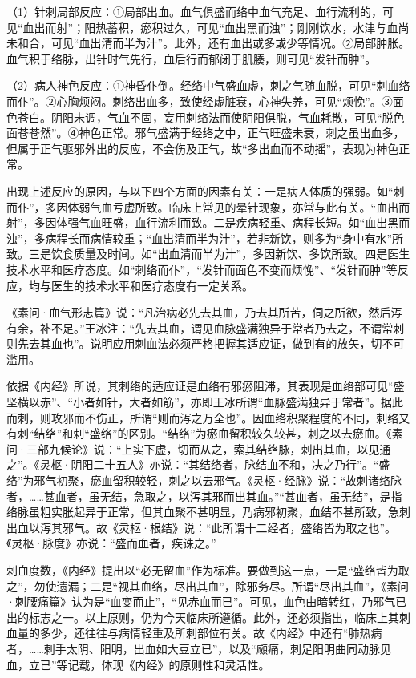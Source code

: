 \documentclass[12pt]{ctexbook}%
\begin{document}
（1）针刺局部反应：①局部出血。血气俱盛而络中血气充足、血行流利的，可见“血出而射”；阳热蓄积，瘀积过久，可见“血出黑而浊”；刚刚饮水，水津与血尚未和合，可见“血出清而半为汁”。此外，还有血出或多或少等情况。②局部肿胀。血气积于络脉，出针时气先行，血后行而郁闭于肌腠，则可见“发针而肿”。

（2）病人神色反应：①神昏仆倒。经络中气盛血虚，刺之气随血脱，可见“刺血络而仆”。②心胸烦闷。刺络出血多，致使经虚脏衰，心神失养，可见“烦悗”。③面色苍白。阴阳未调，气血不固，妄用刺络法而使阴阳俱脱，气血耗散，可见“脱色面苍苍然”。④神色正常。邪气盛满于经络之中，正气旺盛未衰，刺之虽出血多，但属于正气驱邪外出的反应，不会伤及正气，故“多出血而不动摇”，表现为神色正常。

出现上述反应的原因，与以下四个方面的因素有关：一是病人体质的强弱。如“刺而仆”，多因体弱气血亏虚所致。临床上常见的晕针现象，亦常与此有关。“血出而射”，多因体强气血旺盛，血行流利而致。二是疾病轻重、病程长短。如“血出黑而浊”，多病程长而病情较重；“血出清而半为汁”，若非新饮，则多为“身中有水”所致。三是饮食质量及时间。如“出血清而半为汁”，多因新饮、多饮所致。四是医生技术水平和医疗态度。如“刺络而仆”，“发针而面色不变而烦悗”、“发针而肿”等反应，均与医生的技术水平和医疗态度有一定关系。



《素问·血气形志篇》说：“凡治病必先去其血，乃去其所苦，伺之所欲，然后泻有余，补不足。”王冰注：“先去其血，谓见血脉盛满独异于常者乃去之，不谓常刺则先去其血也”。说明应用刺血法必须严格把握其适应证，做到有的放矢，切不可滥用。

依据《内经》所说，其刺络的适应证是血络有邪瘀阻滞，其表现是血络部可见“盛坚横以赤”、“小者如针，大者如筋”，亦即王冰所谓“血脉盛满独异于常者”。据此而刺，则攻邪而不伤正，所谓“则而泻之万全也”。因血络积聚程度的不同，刺络又有刺“结络”和刺“盛络”的区别。“结络”为瘀血留积较久较甚，刺之以去瘀血。《素问·三部九候论》说：“上实下虚，切而从之，索其结络脉，刺出其血，以见通之”。《灵枢·阴阳二十五人》亦说：“其结络者，脉结血不和，决之乃行”。“盛络”为邪气初聚，瘀血留积较轻，刺之以去邪气。《灵枢·经脉》说：“故刺诸络脉者，……甚血者，虽无结，急取之，以泻其邪而出其血。”“甚血者，虽无结”，是指络脉虽粗实胀起异于正常，但其血聚不甚明显，乃病邪初聚，血结不甚所致，急刺出血以泻其邪气。故《灵枢·根结》说：“此所谓十二经者，盛络皆为取之也”。《灵枢·脉度》亦说：“盛而血者，疾诛之。”

刺血度数，《内经》提出以“必无留血”作为标准。要做到这一点，一是“盛络皆为取之”，勿使遗漏；二是“视其血络，尽出其血”，除邪务尽。所谓“尽出其血”，《素问·刺腰痛篇》认为是“血变而止”，“见赤血而已”。可见，血色由暗转红，乃邪气已出的标志之一。以上原则，仍为今天临床所遵循。此外，还必须指出，临床上其刺血量的多少，还往往与病情轻重及所刺部位有关。故《内经》中还有“肺热病者，……刺手太阴、阳明，出血如大豆立已”，以及“顑痛，刺足阳明曲同动脉见血，立已”等记载，体现《内经》的原则性和灵活性。
\end{document}
